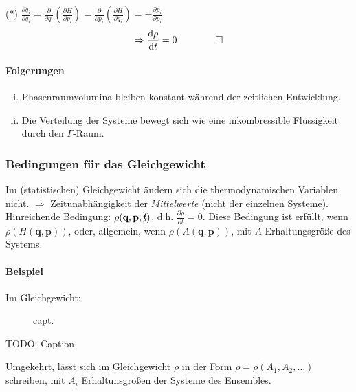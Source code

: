 (*) $\frac{\partial \dot{q}_i}{\partial q_i} = \frac{\partial}{\partial q_i} \left( \frac{\partial H}{\partial p_i} \right) = \frac{\partial}{\partial p_i} \left( \frac{\partial H}{\partial q_i} \right) = - \frac{\partial \dot{p}_i}{\partial p_i}$
\begin{equation}
    \Rightarrow \frac{\mathrm{d} \rho}{\mathrm{d} t} = 0 \qquad \qquad \square
\end{equation}
\paragraph{Folgerungen}
\begin{enumerate}[i)]
    \item Phasenraumvolumina bleiben konstant während der zeitlichen Entwicklung.
    \item Die Verteilung der Systeme bewegt sich wie eine inkombressible Flüssigkeit durch den $\Gamma$-Raum.
\end{enumerate}
\subsubsection{Bedingungen für das Gleichgewicht}
Im (statistischen) Gleichgewicht ändern sich die thermodynamischen Variablen nicht. $\Rightarrow$ Zeitunabhängigkeit der \emph{Mittelwerte}
(nicht der einzelnen Systeme). Hinreichende Bedingung: $\rho(\textbf{q}, \textbf{p}, \xcancel{t})$, d.h. $\frac{\partial \rho}{\partial t} = 0$.
Diese Bedingung ist erfüllt, wenn $\rho(H(\textbf{q}, \textbf{p}))$, oder, allgemein, wenn $\rho(A(\textbf{q}, \textbf{p}))$, mit $A$ Erhaltungsgröße
des Systems.
\paragraph{Beispiel} Im Gleichgewicht:

\begin{figure}[H]
        \centering
        \def\svgwidth{0.5\textwidth}
        
        \caption{capt.}
        \label{img:phaseSpaceBall}
\end{figure}

TODO: Caption %

Umgekehrt, lässt sich im Gleichgewicht $\rho$ in der Form $\rho=\rho(A_1, A_2, \ldots)$ schreiben, mit $A_i$ Erhaltunsgrößen der Systeme des Ensembles.

